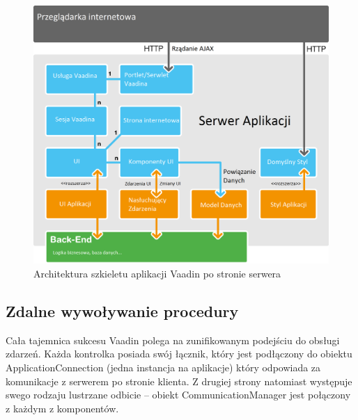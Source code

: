 \begin{figure} [H]
    \begin{center}
	\includegraphics[scale=.3]{img/serverSide.png}
	\caption{Architektura szkieletu aplikacji Vaadin po stronie serwera}
	\label{serverVaadin}
    \end{center}
\end{figure}

\subsection{Zdalne wywoływanie procedury}
Cała tajemnica sukcesu Vaadin polega na zunifikowanym podejściu do obsługi zdarzeń. Każda kontrolka posiada swój łącznik, który jest podłączony do obiektu ApplicationConnection (jedna instancja na aplikacje) który odpowiada za komunikacje z serwerem po stronie klienta. Z drugiej strony natomiast występuje swego
rodzaju lustrzane odbicie – obiekt CommunicationManager jest połączony z każdym z komponentów. 

